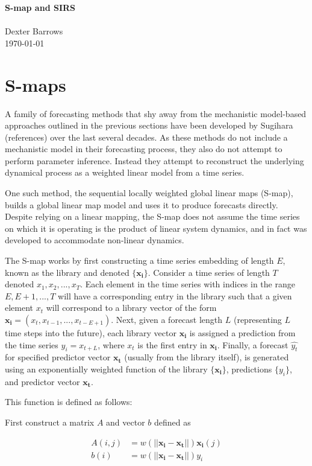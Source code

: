 \documentclass[12pt]{article}
\begin{document}
\noindent
{\LARGE {\bf S-map and SIRS} }
\\\\
Dexter Barrows\\
\today

\section{S-maps}

    A family of forecasting methods that shy away from the mechanistic model-based approaches outlined in the previous sections have been developed by Sugihara (references) over the last several decades. As these methods do not include a mechanistic model in their forecasting process, they also do not attempt to perform parameter inference. Instead they attempt to reconstruct the underlying dynamical process as a weighted linear model from a time series.

    One such method, the sequential locally weighted global linear maps (S-map), builds a global linear map model and uses it to produce forecasts directly. Despite relying on a linear mapping, the S-map does not assume the time series on which it is operating is the product of linear system dynamics, and in fact was developed to accommodate non-linear dynamics.

    The S-map works by first constructing a time series embedding of length $E$, known as the library and denoted $\{\mathbf{x_i}\}$. Consider a time series of length $T$ denoted $x_1, x_2,..., x_T$. Each element in the time series with indices in the range $E,E+1,...,T$ will have a corresponding entry in the library such that a given element $x_t$ will correspond to a library vector of the form $\mathbf{x_i} = (x_t, x_{t-1},...,x_{t-E+1})$. Next, given a forecast length $L$ (representing $L$ time steps into the future), each library vector $\mathbf{x_i}$ is assigned a prediction from the time series $y_i = x_{t+L}$, where $x_t$ is the first entry in $\mathbf{x_i}$. Finally, a forecast ${\hat{y_t}}$ for specified predictor vector $\mathbf{x_t}$ (usually from the library itself), is generated using an exponentially weighted function of the library $\{\mathbf{x_i}\}$, predictions $\{y_i\}$, and predictor vector $\mathbf{x_t}$.

    This function is defined as follows:

    First construct a matrix $A$ and vector $b$ defined as

    \begin{equation}\label{AB}
    	\begin{array}{rl}
        \displaystyle
            A(i, j) & = w (||\mathbf{x_i}-\mathbf{x_t}||) \mathbf{x_i}(j) \\
            b(i) 	& = w (||\mathbf{x_i}-\mathbf{x_t}||) y_i
        \end{array}
    \end{equation}
\end{document}
